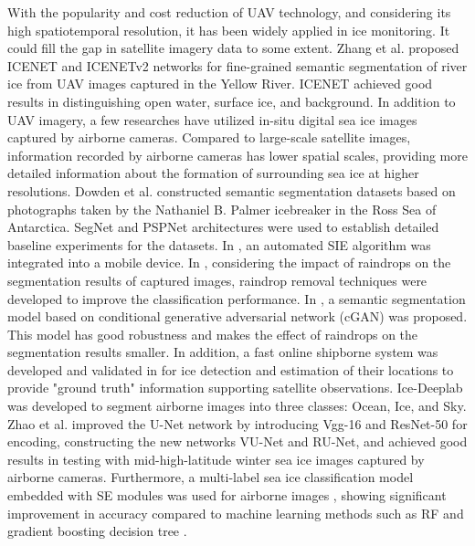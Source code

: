 With the popularity and cost reduction of UAV technology, and considering its high spatiotemporal resolution, it has been widely applied in ice monitoring. It could fill the gap in satellite imagery data to some extent. Zhang et al. \cite{132zhang2020icenet,133zhang2021icenetv2} proposed ICENET and ICENETv2 networks for fine-grained semantic segmentation of river ice from UAV images captured in the Yellow River. ICENET achieved good results in distinguishing open water, surface ice, and background. In addition to UAV imagery, a few researches have utilized in-situ digital sea ice images captured by airborne cameras. Compared to large-scale satellite images, information recorded by airborne cameras has lower spatial scales, providing more detailed information about the formation of surrounding sea ice at higher resolutions. Dowden et al. \cite{134dowden2020sea} constructed semantic segmentation datasets based on photographs taken by the Nathaniel B. Palmer icebreaker in the Ross Sea of Antarctica. SegNet and PSPNet architectures were used to establish detailed baseline experiments for the datasets. In \cite{135balasooriya2021situ}, an automated SIE algorithm was integrated into a mobile device. In \cite{138alsharay2022improved}, considering the impact of raindrops on the segmentation results of captured images, raindrop removal techniques were developed to improve the classification performance. In \cite{147alsharay2023sea}, a semantic segmentation model based on conditional generative adversarial network (cGAN) was proposed. This model has good robustness and makes the effect of raindrops on the segmentation results smaller. In addition, a fast online shipborne system was developed and validated in \cite{137panchi2021supplementing} for ice detection and estimation of their locations to provide "ground truth" information supporting satellite observations. Ice-Deeplab \cite{139zhang2022semantic} was developed to segment airborne images into three classes: Ocean, Ice, and Sky. Zhao et al. \cite{140zhao2022semantic} improved the U-Net network by introducing Vgg-16 and ResNet-50 for encoding, constructing the new networks VU-Net and RU-Net, and achieved good results in testing with mid-high-latitude winter sea ice images captured by airborne cameras. Furthermore, a multi-label sea ice classification model embedded with SE modules was used for airborne images \cite{141chen2022resnet}, showing significant improvement in accuracy compared to machine learning methods such as RF and gradient boosting decision tree \cite{140chen2022navigation}.

